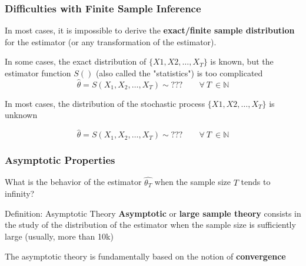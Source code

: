 \documentclass{beamer}
\newenvironment{wideenumerate}{\enumerate\addtolength{\itemsep}{10pt}}{\endenumerate}
\begin{document}
  \begin{frame}
    \frametitle{Difficulties with Finite Sample Inference}
    In most cases, it is impossible to derive the \textbf{exact/finite sample distribution} for the estimator (or any transformation of the estimator).

    \begin{wideenumerate}
    \item In some cases, the exact distribution of $\{ X1, X2, \dots, X_T\}$ is known, but the estimator function $S()$ (also called the "statistics") is too complicated
      \begin{equation*}
        \hat{\theta} = S(X_1, X_2, \dots, X_T) \sim ??? \qquad \forall \ T \ \in \mathbb{N}
      \end{equation*}

      \item In most cases, the distribution of the stochastic process $\{X1, X2, \dots, X_T\}$ is unknown

      \begin{equation*}
        \hat{\theta} = S(X_1, X_2, \dots, X_T) \sim ??? \qquad \forall \ T \ \in \mathbb{N}
      \end{equation*}        
    \end{wideenumerate}
    
  \end{frame}
  


  \begin{frame}
    \frametitle{Asymptotic Properties}

    What is the behavior of the estimator $\hat{\theta_T}$ when the sample size $T$ tends to infinity?

    \begin{block}{Definition: Asymptotic Theory}
      \textbf{Asymptotic} or \textbf{large sample theory} consists in the study of the distribution of the estimator when the sample size is sufficiently large (usually, more than 10k)
    \end{block}

    The asymptotic theory is fundamentally based on the notion of \textbf{convergence}
    
  \end{frame}
  
\end{document}
